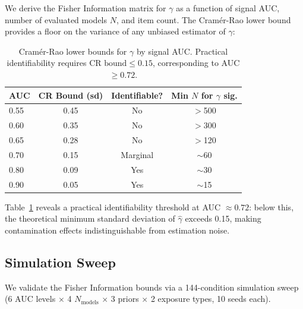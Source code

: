 \documentclass[letterpaper,11pt]{article}
\begin{document}
We derive the Fisher Information matrix for $\gamma$ as a function of signal AUC, number of evaluated models $N$, and item count.
The Cram\'er-Rao lower bound provides a floor on the variance of any unbiased estimator of $\gamma$:

\begin{table}[t]
\centering
\caption{Cram\'er-Rao lower bounds for $\gamma$ by signal AUC. Practical identifiability requires $\text{CR bound} \leq 0.15$, corresponding to AUC $\geq 0.72$.}
\label{tab:cramer_rao}
\begin{tabular}{@{}lccc@{}}
\toprule
AUC & CR Bound (sd) & Identifiable? & Min $N$ for $\gamma$ sig. \\
\midrule
0.55 & 0.45 & No & $>$500 \\
0.60 & 0.35 & No & $>$300 \\
0.65 & 0.28 & No & $>$120 \\
0.70 & 0.15 & Marginal & $\sim$60 \\
0.80 & 0.09 & Yes & $\sim$30 \\
0.90 & 0.05 & Yes & $\sim$15 \\
\bottomrule
\end{tabular}
\end{table}

Table~\ref{tab:cramer_rao} reveals a practical identifiability threshold at AUC $\approx 0.72$: below this, the theoretical minimum standard deviation of $\hat{\gamma}$ exceeds 0.15, making contamination effects indistinguishable from estimation noise.

\subsection{Simulation Sweep}
\label{sec:sim_sweep}

We validate the Fisher Information bounds via a 144-condition simulation sweep (6 AUC levels $\times$ 4 $N_{\text{models}}$ $\times$ 3 priors $\times$ 2 exposure types, 10 seeds each).
\end{document}
